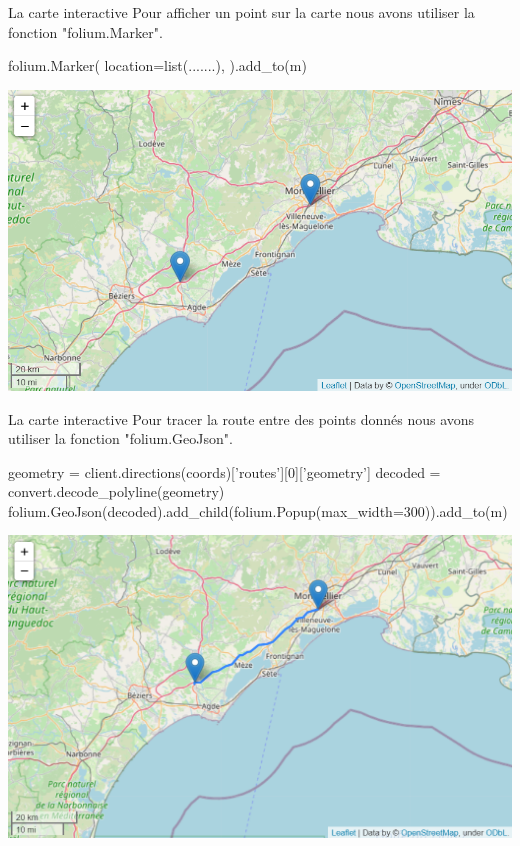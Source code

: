 \documentclass[aspectratio=169]{beamer}
\begin{document}
\begin{frame}{La carte interactive}
Pour afficher un point sur la carte nous avons utiliser la fonction "folium.Marker".

 \begin{block}{}
  {\color{blue}folium.Marker( location=list(.......),  ).add\_to(m)} 
 \end{block} 

 \begin{center}
  \includegraphics[scale=0.5]{Carte_2_point.png}
 \end{center}
\end{frame}

\begin{frame}{La carte interactive}
Pour tracer la route entre des points donnés nous avons utiliser la fonction "folium.GeoJson".
 \begin{block}{}
  {\color{blue}geometry = client.directions(coords)['routes'][0]['geometry']
 decoded = convert.decode\_polyline(geometry)
 folium.GeoJson(decoded).add\_child(folium.Popup(max\_width=300)).add\_to(m)} 
 \end{block} 
 
 \begin{center}
  \includegraphics[scale=0.4]{Carte_iti.png}
 \end{center}
\end{frame}
\end{document}
